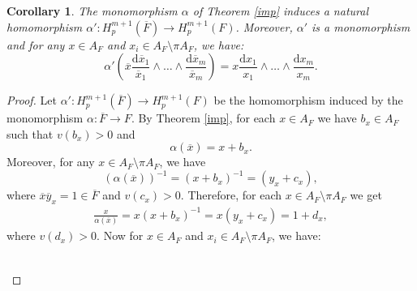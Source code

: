 \documentclass[times,10pt]{amsart}
\newtheorem{cor}[thm]{Corollary}%
\begin{document}
{\begin{cor}\label{T1c}
{The monomorphism $\alpha$ of Theorem \ref{imp} induces a natural homomorphism $\alpha': H_p^{m+1}(\overline{F})\xrightarrow{}  H_p^{m+1}(F)$. Moreover, $\alpha'$ is a monomorphism and for any $x\in A_F$ and $x_i\in A_F\setminus\pi A_F$,} we have: $$\displaystyle{\alpha'\left(  {\overline{x}\frac{\mathrm{d} \overline{x}_{1}}{\overline{x}_{1}}\wedge \ldots \wedge \frac{\mathrm{d}\overline{x}_{m}}{\overline{x}_{m}}}\right) =  { x\frac{\mathrm{d}x_{1}}{x_{1}}\wedge \ldots \wedge \frac{\mathrm{d}x_{m}}{x_{m}}}}.$$
 \end{cor}
 \begin{proof} Let $\alpha': H_p^{m+1}(\overline{F})\xrightarrow{}  H_p^{m+1}(F)$ be the homomorphism induced by the monomorphism $\alpha:\overline{F}\longrightarrow F$. By   Theorem \ref{imp}, for each $x\in A_F$ we have $b_x\in A_F$ such that $v(b_x)>0$ and$$ \alpha( \overline{x})= x+ b_x.$$Moreover, for any $x\in A_F\setminus\pi A_F$,  we have  $$(\alpha(\overline{x}))^{-1}= (x+ b_x)^{-1}= (y_x+c_x),$$  where  $\overline{x} \overline{y}_x=1\in \overline{F} $ and $v(c_x)>0.$ Therefore,  for each $x\in A_F\setminus  \pi A_F$ we get \begin{align}\label{t1em}
          \frac{ x}{\alpha(\overline{x})}= x( x+b_x)^{-1}= x(y_x+c_x)= 1+ d_x,
     \end{align} where $v(d_x)>0$.  Now for $ x\in A_F$ and $x_i\in A_F\setminus\pi A_F$,  we have:   \begin{center}\begin{align*}

\end{align*}
\end{center}
\end{proof}}
\end{document}
